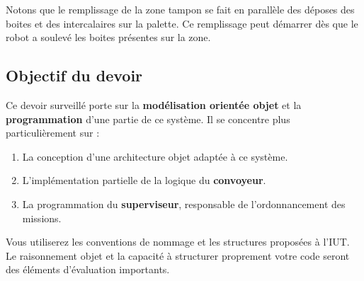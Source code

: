 Notons que le remplissage de la zone tampon se fait en parallèle des déposes des boites et des intercalaires sur la palette. Ce remplissage peut démarrer dès que le robot a soulevé les boites présentes sur la zone.  

\subsection*{Objectif du devoir}

Ce devoir surveillé porte sur la \textbf{modélisation orientée objet} et la \textbf{programmation} d'une partie de ce système. Il se concentre plus particulièrement sur :

\begin{enumerate}
    \item La conception d'une architecture objet adaptée à ce système.
    \item L'implémentation partielle de la logique du \textbf{convoyeur}.
    \item La programmation du \textbf{superviseur}, responsable de l'ordonnancement des missions.
\end{enumerate}

Vous utiliserez les conventions de nommage et les structures proposées à l'IUT. Le raisonnement objet et la capacité à structurer proprement votre code seront des éléments d'évaluation importants.